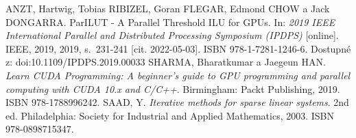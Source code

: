 \clearpage  							   	 %

\begin{thebibliography}{3}

ANZT, Hartwig, Tobias RIBIZEL, Goran FLEGAR, Edmond CHOW a Jack DONGARRA. ParILUT - A Parallel Threshold ILU for GPUs. In: \textit{2019 IEEE International Parallel and Distributed Processing Symposium (IPDPS)} [online]. IEEE, 2019, 2019, s.~231-241 [cit. 2022-05-03]. ISBN 978-1-7281-1246-6. Dostupné z: doi:10.1109/IPDPS.2019.00033
SHARMA, Bharatkumar a Jaegeun HAN. \textit{Learn CUDA Programming: A beginner's guide to GPU programming and parallel computing with CUDA 10.x and C/C++}. Birmingham: Packt Publishing, 2019. ISBN 978-1788996242.
SAAD, Y. \textit{Iterative methods for sparse linear systems}. 2nd ed. Philadelphia: Society for Industrial and Applied Mathematics, 2003. ISBN 978-0898715347.

\end{thebibliography}